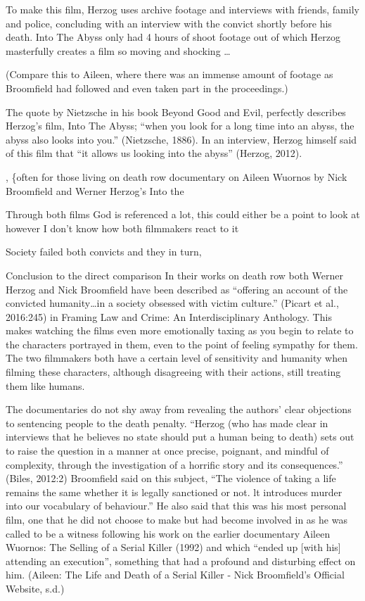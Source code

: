 \documentclass[
  12pt,
]{book}
\begin{document}
To make this film, Herzog uses archive footage and interviews with friends, family and police, concluding with an interview with the convict shortly before his death. Into The Abyss only had 4 hours of shoot footage out of which Herzog masterfully creates a film so moving and shocking \ldots{}

(Compare this to Aileen, where there was an immense amount of footage as Broomfield had followed and even taken part in the proceedings.)

The quote by Nietzsche in his book Beyond Good and Evil, perfectly describes Herzog's film, Into The Abyss; ``when you look for a long time into an abyss, the abyss also looks into you.'' (Nietzsche, 1886). In an interview, Herzog himself said of this film that ``it allows us looking into the abyss'' (Herzog, 2012).

, \{often for those living on death row documentary on Aileen Wuornos by Nick Broomfield and Werner Herzog's Into the

Through both films God is referenced a lot, this could either be a point to look at however I don't know how both filmmakers react to it

Society failed both convicts and they in turn,

Conclusion to the direct comparison In their works on death row both Werner Herzog and Nick Broomfield have been described as ``offering an account of the convicted humanity\ldots in a society obsessed with victim culture.'' (Picart et al., 2016:245) in Framing Law and Crime: An Interdisciplinary Anthology. This makes watching the films even more emotionally taxing as you begin to relate to the characters portrayed in them, even to the point of feeling sympathy for them. The two filmmakers both have a certain level of sensitivity and humanity when filming these characters, although disagreeing with their actions, still treating them like humans.

The documentaries do not shy away from revealing the authors' clear objections to sentencing people to the death penalty. ``Herzog (who has made clear in interviews that he believes no state should put a human being to death) sets out to raise the question in a manner at once precise, poignant, and mindful of complexity, through the investigation of a horrific story and its consequences.'' (Biles, 2012:2) Broomfield said on this subject, ``The violence of taking a life remains the same whether it is legally sanctioned or not. lt introduces murder into our vocabulary of behaviour.'' He also said that this was his most personal film, one that he did not choose to make but had become involved in as he was called to be a witness following his work on the earlier documentary Aileen Wuornos: The Selling of a Serial Killer (1992) and which ``ended up {[}with his{]} attending an execution'', something that had a profound and disturbing effect on him. (Aileen: The Life and Death of a Serial Killer - Nick Broomfield's Official Website, s.d.)
\end{document}
